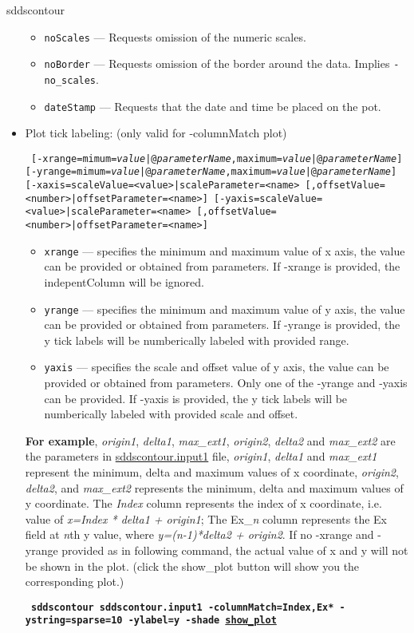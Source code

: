 \begin{sddsprog}{sddscontour}
\begin{itemize}
\begin{itemize}
        \item \verb|noScales| --- Requests omission of the numeric scales.
        \item \verb|noBorder| --- Requests omission of the border around the data.  Implies \verb|-no_scales|.
        \item \verb|dateStamp| --- Requests that the date and time be placed on the pot.
        \end{itemize}
    \item Plot tick labeling: (only valid for -columnMatch plot)
\begin{flushleft}{\tt
[-xrange=mimum={\em value}|@{\em parameterName},maximum={\em value}|@{\em parameterName}] 
[-yrange=mimum={\em value}|@{\em parameterName},maximum={\em value}|@{\em parameterName}]
[-xaxis=scaleValue=<value>|scaleParameter=<name>
   [,offsetValue=<number>|offsetParameter=<name>] 
[-yaxis=scaleValue=<value>|scaleParameter=<name>
   [,offsetValue=<number>|offsetParameter=<name>]
}\end{flushleft}
        \begin{itemize} 
        \item \verb|xrange| --- specifies the minimum and maximum value of x axis, the value can be provided or obtained from parameters. If -xrange is provided, the indepentColumn will be ignored.
        \item \verb|yrange| --- specifies the minimum and maximum value of y axis, the value can be provided or obtained from parameters. If -yrange is provided, the y tick labels will be numberically labeled with provided range.
        \item \verb|yaxis| --- specifies the scale and offset value of y axis, the value can be provided or obtained from parameters. Only one of the -yrange and -yaxis can be provided. If -yaxis is provided, the y tick labels will be numberically labeled with provided scale and offset.
        \end{itemize}
        {\bf For example}, {\em origin1}, {\em delta1}, {\em max\_ext1}, {\em origin2}, {\em delta2} and {\em max\_ext2} are the parameters in \href{https://ops.aps.anl.gov/manuals/example_files/sddscontour.input1}{sddscontour.input1} file, {\em origin1}, {\em delta1} and {\em max\_ext1} represent the minimum, delta and maximum values of x coordinate, {\em origin2}, {\em delta2}, and {\em max\_ext2} represents the minimum, delta and maximum values of y coordinate. The {\em Index} column represents the index of x coordinate, i.e. value of {\em x=Index * delta1 + origin1}; The Ex\_{\em n} column represents the Ex field at {\em n}th y value, where {\em y=(n-1)*delta2 + origin2}. If no -xrange and -yrange provided as in following command, the actual value of x and y will not be shown in the plot. (click the show\_plot button will show you the corresponding plot.) 
       \begin{flushleft}{\tt \bf
            sddscontour sddscontour.input1 -columnMatch=Index,Ex* -ystring=sparse=10 -ylabel=y -shade
         \href{https://ops.aps.anl.gov/manuals/example_files/sddscontour1_img.html}{show\_plot}
        }\end{flushleft}


\end{itemize}
\end{sddsprog}
